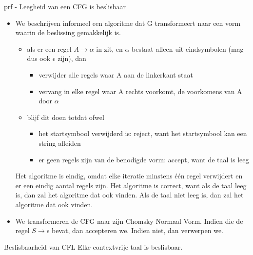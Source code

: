 \begin{prf}{prf - Leegheid van een CFG is beslisbaar}
    \begin{itemize}
        \item 
            We beschrijven informeel een algoritme dat G transformeert naar een vorm waarin de beslissing gemakkelijk is.
            \begin{itemize}
                \item 
                    als er een regel $A \to \alpha$ in zit, en $\alpha$ bestaat alleen uit eindsymbolen (mag dus ook $\epsilon$ zijn), dan 
                    \begin{itemize}
                        \item verwijder alle regels waar A aan de linkerkant staat
                        \item vervang in elke regel waar A rechts voorkomt, de voorkomens van A door $\alpha$
                    \end{itemize}
                \item 
                    blijf dit doen totdat ofwel
                    \begin{itemize}
                        \item het startsymbool verwijderd is: reject, want het startsymbool kan een string afleiden
                        \item er geen regels zijn van de benodigde vorm: accept, want de taal is leeg
                    \end{itemize}
            \end{itemize}
            Het algoritme is eindig, omdat elke iteratie minstens één regel verwijdert en er een eindig aantal regels zijn. Het algoritme is correct, want als de taal leeg is, dan zal het algoritme dat ook vinden. Als de taal niet leeg is, dan zal het algoritme dat ook vinden.
        \item 
            We transformeren de CFG naar zijn Chomsky Normaal Vorm. Indien die de regel $S \to \epsilon$ bevat, dan accepteren we. Indien niet, dan verwerpen we.
    \end{itemize}
\end{prf}

\begin{lem}{Beslisbaarheid van CFL}
    Elke contextvrije taal is beslisbaar.
\end{lem}

